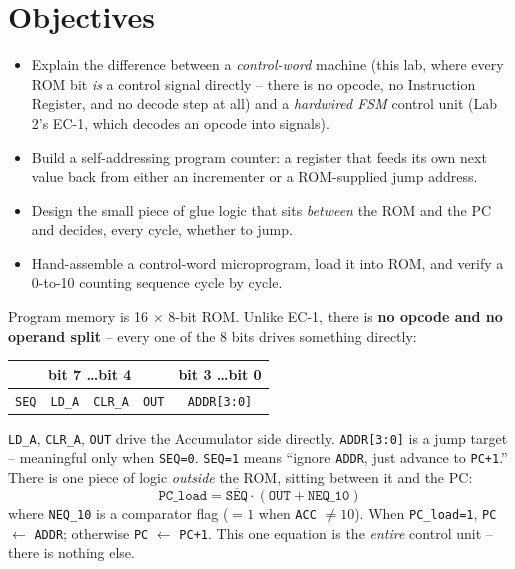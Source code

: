 \documentclass[11pt]{article}
\begin{document}
\labheader

\section*{Objectives}
\begin{itemize}[leftmargin=*,nosep]
  \item Explain the difference between a \emph{control-word} machine (this lab,
        where every ROM bit \emph{is} a control signal directly -- there is no
        opcode, no Instruction Register, and no decode step at all) and a
        \emph{hardwired FSM} control unit (Lab 2's EC-1, which decodes an
        opcode into signals).
  \item Build a self-addressing program counter: a register that feeds its own next
        value back from either an incrementer or a ROM-supplied jump address.
  \item Design the small piece of glue logic that sits \emph{between} the ROM and the
        PC and decides, every cycle, whether to jump.
  \item Hand-assemble a control-word microprogram, load it into ROM, and verify a
        0-to-10 counting sequence cycle by cycle.
\end{itemize}

\begin{summary}
Program memory is 16 $\times$ 8-bit ROM. Unlike EC-1, there is \textbf{no opcode and
no operand split} -- every one of the 8 bits drives something directly:
\begin{center}
\begin{tabular}{@{}cccccccc@{}}
\toprule
\multicolumn{4}{c}{bit 7 \quad\ldots\quad bit 4} & \multicolumn{4}{c}{bit 3 \quad\ldots\quad bit 0} \\
\midrule
\texttt{SEQ} & \texttt{LD\_A} & \texttt{CLR\_A} & \texttt{OUT} & \multicolumn{4}{c}{\texttt{ADDR[3:0]}} \\
\bottomrule
\end{tabular}
\end{center}
\texttt{LD\_A}, \texttt{CLR\_A}, \texttt{OUT} drive the Accumulator side directly.
\texttt{ADDR[3:0]} is a jump target -- meaningful only when \texttt{SEQ=0}.
\texttt{SEQ=1} means ``ignore \texttt{ADDR}, just advance to \texttt{PC+1}.''
There is one piece of logic \emph{outside} the ROM, sitting between it and the PC:
\[
\texttt{PC\_load} = \overline{\texttt{SEQ}} \cdot (\texttt{OUT} + \texttt{NEQ\_10})
\]
where \texttt{NEQ\_10} is a comparator flag ($=1$ when \texttt{ACC} $\neq 10$).
When \texttt{PC\_load=1}, \texttt{PC} $\leftarrow$ \texttt{ADDR}; otherwise
\texttt{PC} $\leftarrow$ \texttt{PC+1}. This one equation is the \emph{entire}
control unit -- there is nothing else.
\end{summary}
\end{document}
